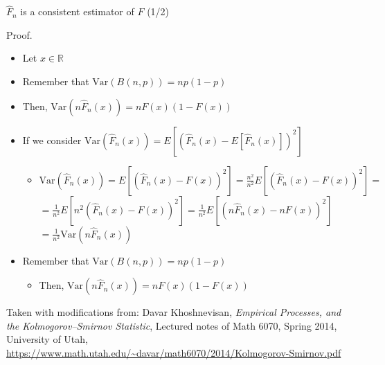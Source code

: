 \documentclass{beamer}
\begin{document}
\begin{frame}
{\centerline{$\widehat {F}_{n}$ is a consistent estimator of $F$ (1/2)}}

Proof.
\begin{itemize}
\item Let $x \in \mathbb{R}$
\item Remember that $\text{Var}(B(n,p))=np(1-p)$
\item Then, $\text{Var}(n \widehat {F}_{n} (x)) = nF(x)(1-F(x)) $
\item If we consider  $\text{Var}(\widehat {F}_{n} (x)) = E[ (\widehat {F}_{n} (x) - E[\widehat {F}_{n} (x)])^2]$
\begin{itemize}
\item  $\text{Var}(\widehat {F}_{n} (x)) = E[ (\widehat {F}_{n} (x) - F(x))^2] = \frac{n^2}{n^2} E[ (\widehat {F}_{n} (x) - F(x))^2] = $\\
	$ =  \frac{1}{n^2} E[ n^2(\widehat {F}_{n} (x) - F(x))^2] = \frac{1}{n^2} E[ (n\widehat {F}_{n} (x) - nF(x))^2]$\\
	$ =  \frac{1}{n^2} \text{Var}(n \widehat {F}_{n} (x)) $
\end{itemize}
\item Remember that $\text{Var}(B(n,p))=np(1-p)$
\begin{itemize}
\item  Then, $\text{Var}(n \widehat {F}_{n} (x)) = nF(x)(1-F(x)) $
\end{itemize}
\end{itemize}

\begin{center}
\tiny{Taken with modifications from: Davar Khoshnevisan, \textit{Empirical Processes, and the Kolmogorov–Smirnov Statistic}, Lectured notes of Math 6070, Spring 2014, University of Utah, \url{https://www.math.utah.edu/~davar/math6070/2014/Kolmogorov-Smirnov.pdf}}
\end{center}

\end{frame}
\end{document}
